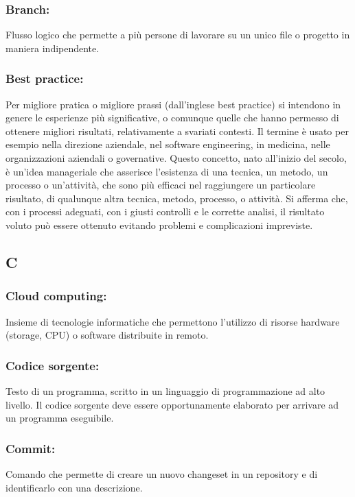 \subsubsection*{Branch:} 
Flusso logico che permette a pi\`u persone di lavorare su un unico file o
progetto in maniera indipendente.

\subsubsection*{Best practice:}
Per migliore pratica o migliore prassi (dall'inglese best practice) si intendono
 in genere le esperienze pi\`u significative, o comunque quelle che hanno
 permesso di ottenere migliori risultati, relativamente a svariati contesti.
Il termine \`e usato per esempio nella direzione aziendale, nel software
engineering, in medicina, nelle organizzazioni aziendali o governative.
Questo concetto, nato all'inizio del secolo, \`e un'idea manageriale che
asserisce l'esistenza di una tecnica, un metodo, un processo o un'attivit\`a,
che sono pi\`u efficaci nel raggiungere un particolare risultato, di qualunque
altra tecnica, metodo, processo, o attivit\`a. Si afferma che, con i processi
adeguati, con i giusti controlli e le corrette analisi, il risultato voluto
pu\`o essere ottenuto evitando problemi e complicazioni impreviste.

\subsection*{\huge{C}}

\subsubsection*{Cloud computing:} Insieme di tecnologie informatiche che
permettono l'utilizzo di risorse hardware (storage, CPU) o software distribuite in remoto.

\subsubsection*{Codice sorgente:} Testo di un programma, scritto in un
linguaggio di programmazione ad alto livello. Il codice sorgente deve essere
opportunamente elaborato per arrivare ad un programma eseguibile.

\subsubsection*{Commit:} Comando che permette di creare un nuovo changeset in
un repository e di identificarlo con una descrizione.

